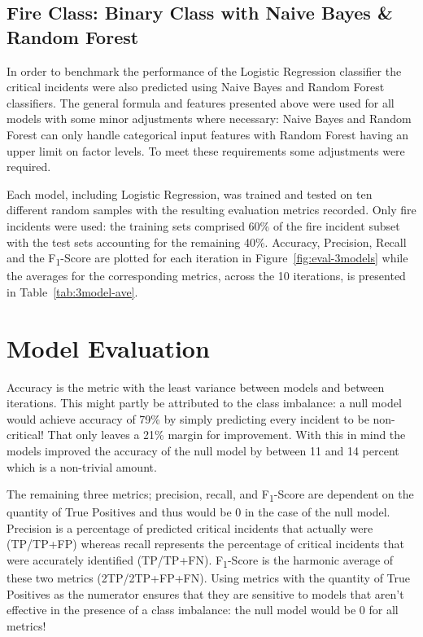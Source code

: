 \documentclass[12pt,letterpaper, oneside]
{article}
\begin{document}
\subsection{Fire Class: Binary Class with Naive Bayes \& Random Forest}

In order to benchmark the performance of the Logistic Regression classifier the critical incidents were also predicted using Naive Bayes and Random Forest classifiers. The general formula and features presented above were used for all models with some minor adjustments where necessary: Naive Bayes and Random Forest can only handle categorical input features with Random Forest having an upper limit on factor levels. To meet these requirements some adjustments were required.

Each model, including Logistic Regression, was trained and tested on ten different random samples with the resulting evaluation metrics recorded. Only fire incidents were used: the training sets comprised 60\% of the fire incident subset with the test sets accounting for the remaining 40\%. Accuracy, Precision, Recall and the F\textsubscript{1}-Score are plotted for each iteration in Figure~\ref{fig:eval-3models} while the averages for the corresponding metrics, across the 10 iterations, is presented in Table~\ref{tab:3model-ave}.

\section{Model Evaluation}

Accuracy is the metric with the least variance between models and between iterations. This might partly be attributed to the class imbalance: a null model would achieve accuracy of 79\% by simply predicting every incident to be non-critical! That only leaves a 21\% margin for improvement. With this in mind the models improved the accuracy of the null model by between 11 and 14 percent which is a non-trivial amount.

The remaining three metrics; precision, recall, and F\textsubscript{1}-Score are dependent on the quantity of True Positives and thus would be 0 in the case of the null model. Precision is a percentage of predicted critical incidents that actually were (TP/TP+FP) whereas recall represents the percentage of critical incidents that were accurately identified (TP/TP+FN). F\textsubscript{1}-Score is the harmonic average of these two metrics (2TP/2TP+FP+FN). Using metrics with the quantity of True Positives as the numerator ensures that they are sensitive to models that aren't effective in the presence of a class imbalance: the null model would be 0 for all metrics!
\end{document}
